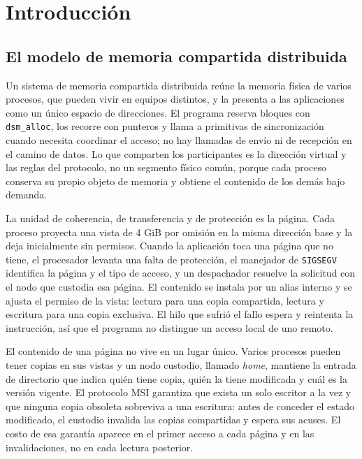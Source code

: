 \section{Introducción}\label{sec:introduccion}

\subsection{El modelo de memoria compartida distribuida}

Un sistema de memoria compartida distribuida reúne la memoria física de varios procesos, que pueden vivir en equipos distintos, y la presenta a las aplicaciones como un único espacio de direcciones. El programa reserva bloques con \texttt{dsm\_alloc}, los recorre con punteros y llama a primitivas de sincronización cuando necesita coordinar el acceso; no hay llamadas de envío ni de recepción en el camino de datos. Lo que comparten los participantes es la dirección virtual y las reglas del protocolo, no un segmento físico común, porque cada proceso conserva su propio objeto de memoria y obtiene el contenido de los demás bajo demanda.

La unidad de coherencia, de transferencia y de protección es la página. Cada proceso proyecta una vista de 4 GiB por omisión en la misma dirección base y la deja inicialmente sin permisos. Cuando la aplicación toca una página que no tiene, el procesador levanta una falta de protección, el manejador de \texttt{SIGSEGV} identifica la página y el tipo de acceso, y un despachador resuelve la solicitud con el nodo que custodia esa página. El contenido se instala por un alias interno y se ajusta el permiso de la vista: lectura para una copia compartida, lectura y escritura para una copia exclusiva. El hilo que sufrió el fallo espera y reintenta la instrucción, así que el programa no distingue un acceso local de uno remoto.

El contenido de una página no vive en un lugar único. Varios procesos pueden tener copias en sus vistas y un nodo custodio, llamado \emph{home}, mantiene la entrada de directorio que indica quién tiene copia, quién la tiene modificada y cuál es la versión vigente. El protocolo MSI garantiza que exista un solo escritor a la vez y que ninguna copia obsoleta sobreviva a una escritura: antes de conceder el estado modificado, el custodio invalida las copias compartidas y espera sus acuses. El costo de esa garantía aparece en el primer acceso a cada página y en las invalidaciones, no en cada lectura posterior.

